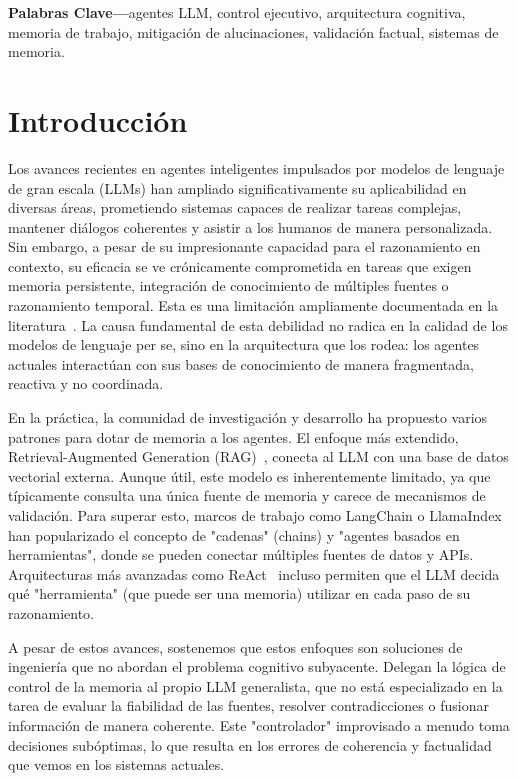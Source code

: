 \documentclass[journal,onecolumn]{IEEEtran}
\begin{document}
\begin{IEEEkeywords}
\textbf{Palabras Clave---}agentes LLM, control ejecutivo, arquitectura cognitiva, memoria de trabajo, mitigación de alucinaciones, validación factual, sistemas de memoria.
\end{IEEEkeywords}

\tableofcontents
\newpage %


\section{Introducción}

Los avances recientes en agentes inteligentes impulsados por modelos de lenguaje de gran escala (LLMs) han ampliado significativamente su aplicabilidad en diversas áreas, prometiendo sistemas capaces de realizar tareas complejas, mantener diálogos coherentes y asistir a los humanos de manera personalizada. Sin embargo, a pesar de su impresionante capacidad para el razonamiento en contexto, su eficacia se ve crónicamente comprometida en tareas que exigen memoria persistente, integración de conocimiento de múltiples fuentes o razonamiento temporal. Esta es una limitación ampliamente documentada en la literatura~\cite{zhang2024survey}. La causa fundamental de esta debilidad no radica en la calidad de los modelos de lenguaje per se, sino en la arquitectura que los rodea: los agentes actuales interactúan con sus bases de conocimiento de manera fragmentada, reactiva y no coordinada.

En la práctica, la comunidad de investigación y desarrollo ha propuesto varios patrones para dotar de memoria a los agentes. El enfoque más extendido, Retrieval-Augmented Generation (RAG)~\cite{lewis2020retrieval}, conecta al LLM con una base de datos vectorial externa. Aunque útil, este modelo es inherentemente limitado, ya que típicamente consulta una única fuente de memoria y carece de mecanismos de validación. Para superar esto, marcos de trabajo como LangChain o LlamaIndex han popularizado el concepto de "cadenas" (chains) y "agentes basados en herramientas", donde se pueden conectar múltiples fuentes de datos y APIs. Arquitecturas más avanzadas como ReAct~\cite{yao2022react} incluso permiten que el LLM decida qué "herramienta" (que puede ser una memoria) utilizar en cada paso de su razonamiento.

A pesar de estos avances, sostenemos que estos enfoques son soluciones de ingeniería que no abordan el problema cognitivo subyacente. Delegan la lógica de control de la memoria al propio LLM generalista, que no está especializado en la tarea de evaluar la fiabilidad de las fuentes, resolver contradicciones o fusionar información de manera coherente. Este "controlador" improvisado a menudo toma decisiones subóptimas, lo que resulta en los errores de coherencia y factualidad que vemos en los sistemas actuales.
\end{document}
